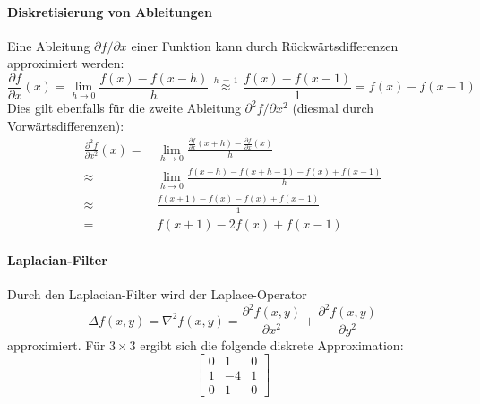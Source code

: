 				\paragraph{Diskretisierung von Ableitungen}
					Eine Ableitung \( \partial f / \partial x \) einer Funktion kann durch Rückwärtsdifferenzen approximiert werden:
					\begin{equation*}
						\frac{\partial f}{\partial x}(x) = \lim\limits_{h \to 0} \frac{f(x) - f(x - h)}{h} \overset{\,h \,=\, 1\,}{\approx} \frac{f(x) - f(x - 1)}{1} = f(x) - f(x - 1)
					\end{equation*}
					Dies gilt ebenfalls für die zweite Ableitung \( \partial^2 f / \partial x^2 \) (diesmal durch Vorwärtsdifferenzen):
					\begin{align*}
						\frac{\partial^2 f}{\partial x^2}(x)
							=&\, \lim\limits_{h \to 0} \frac{\frac{\partial f}{\partial x}(x + h) - \frac{\partial f}{\partial x}(x)}{h} \\
							\approx&\, \lim\limits_{h \to 0} \frac{f(x + h) - f(x + h - 1) - f(x) + f(x - 1)}{h} \\
							\approx&\, \frac{f(x + 1) - f(x) - f(x) + f(x - 1)}{1} \\
							=&\, f(x + 1) - 2f(x) + f(x - 1)
					\end{align*}
				
				\paragraph{Laplacian-Filter}
					Durch den Laplacian-Filter wird der Laplace-Operator
					\begin{equation*}
						\Delta f(x, y) = \nabla^2 f(x, y) = \frac{\partial^2 f(x, y)}{\partial x^2} + \frac{\partial^2 f(x, y)}{\partial y^2}
					\end{equation*}
					approximiert. Für \( 3 \times 3 \) ergibt sich \bspw die folgende diskrete Approximation:
					\begin{equation*}
						\begin{bmatrix}
							0 & 1  & 0 \\
							1 & -4 & 1 \\
							0 & 1  & 0
						\end{bmatrix}
					\end{equation*}
					
